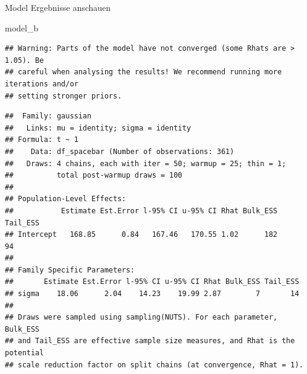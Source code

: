 \documentclass[
]{article}
\newenvironment{Shaded}{\begin{snugshade}}{\end{snugshade}}
\newcommand{\AttributeTok}[1]{\textcolor[rgb]{0.77,0.63,0.00}{#1}}
\newcommand{\CommentTok}[1]{\textcolor[rgb]{0.56,0.35,0.01}{\textit{#1}}}
\newcommand{\DecValTok}[1]{\textcolor[rgb]{0.00,0.00,0.81}{#1}}
\newcommand{\FunctionTok}[1]{\textcolor[rgb]{0.00,0.00,0.00}{#1}}
\newcommand{\NormalTok}[1]{#1}
\newcommand{\OtherTok}[1]{\textcolor[rgb]{0.56,0.35,0.01}{#1}}
\newcommand{\SpecialCharTok}[1]{\textcolor[rgb]{0.00,0.00,0.00}{#1}}
\begin{document}
\begin{Shaded}
\end{Shaded}

Model Ergebnisse anschauen

\begin{Shaded}
\begin{Highlighting}[]
\NormalTok{model\_b}
\end{Highlighting}
\end{Shaded}

\begin{verbatim}
## Warning: Parts of the model have not converged (some Rhats are > 1.05). Be
## careful when analysing the results! We recommend running more iterations and/or
## setting stronger priors.
\end{verbatim}

\begin{verbatim}
##  Family: gaussian 
##   Links: mu = identity; sigma = identity 
## Formula: t ~ 1 
##    Data: df_spacebar (Number of observations: 361) 
##   Draws: 4 chains, each with iter = 50; warmup = 25; thin = 1;
##          total post-warmup draws = 100
## 
## Population-Level Effects: 
##           Estimate Est.Error l-95% CI u-95% CI Rhat Bulk_ESS Tail_ESS
## Intercept   168.85      0.84   167.46   170.55 1.02      182       94
## 
## Family Specific Parameters: 
##       Estimate Est.Error l-95% CI u-95% CI Rhat Bulk_ESS Tail_ESS
## sigma    18.06      2.04    14.23    19.99 2.87        7       14
## 
## Draws were sampled using sampling(NUTS). For each parameter, Bulk_ESS
## and Tail_ESS are effective sample size measures, and Rhat is the potential
## scale reduction factor on split chains (at convergence, Rhat = 1).
\end{verbatim}
\end{document}
